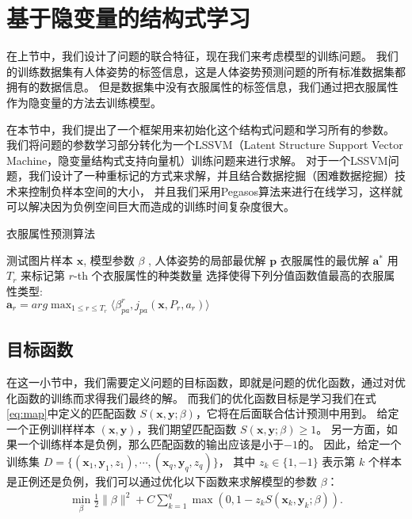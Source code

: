 \section{基于隐变量的结构式学习}
在上节中，我们设计了问题的联合特征，现在我们来考虑模型的训练问题。
我们的训练数据集有人体姿势的标签信息，这是人体姿势预测问题的所有标准数据集都拥有的数据信息。
但是数据集中没有衣服属性的标签信息，我们通过把衣服属性作为隐变量的方法去训练模型。

在本节中，我们提出了一个框架用来初始化这个结构式问题和学习所有的参数。
我们将问题的参数学习部分转化为一个LSSVM（Latent Structure Support Vector Machine，隐变量结构式支持向量机）训练问题来进行求解。
对于一个LSSVM问题，我们设计了一种重标记的方式来求解，并且结合数据挖掘（困难数据挖掘）技术来控制负样本空间的大小，
并且我们采用Pegasos\cite{pegasos}算法来进行在线学习，这样就可以解决因为负例空间巨大而造成的训练时间复杂度很大。

\begin{algorithm}
\caption{衣服属性预测算法}
\begin{algorithmic}[1]
    \REQUIRE 测试图片样本 $\mathbf{x}$, 模型参数 $\beta$ , 人体姿势的局部最优解 $\mathbf{p}$
    \ENSURE 衣服属性的最优解 $\mathbf{a^*}$
    \STATE 用 $T_r$ 来标记第 $r$-th 个衣服属性的种类数量
        \STATE 选择使得下列分值函数值最高的衣服属性类型:\\
            $\mathbf{a}_r = arg \max_{1 \leq r \leq T_r} \langle \beta_{pa}^r, j_{pa}(\mathbf{x}, P_r, a_r) \rangle $
    \ENDFOR
\end{algorithmic}
\label{alg:attr}
\end{algorithm}


\subsection{目标函数}
在这一小节中，我们需要定义问题的目标函数，即就是问题的优化函数，通过对优化函数的训练而求得我们最终的解。
而我们的优化函数目标是学习我们在式\ref{eq:map}中定义的匹配函数 $S(\mathbf{x}, \mathbf{y}; \beta)$，它将在后面联合估计预测中用到。
给定一个正例训样样本 $(\mathbf{x}, \mathbf{y})$，我们期望匹配函数 $S(\mathbf{x}, \mathbf{y}; \beta) \geq 1$。
另一方面，如果一个训练样本是负例，那么匹配函数的输出应该是小于$-1$的。
因此，给定一个训练集 $D = \{ (\mathbf{x}_1, \mathbf{y}_1, z_1), \cdots, (\mathbf{x}_q, \mathbf{y}_q, z_q) \}$， 其中 $z_k \in \{1, -1\}$ 表示第 $k$ 个样本是正例还是负例，我们可以通过优化以下函数来求解模型的参数 $\beta$：
\begin{equation}
\begin{split}
\min_{\beta}  \frac{1}{2} \|\beta\|^2 + C \sum_{k=1}^{q}\max(0, 1 - z_k S(\mathbf{x}_k, \mathbf{y}_k; \beta)).
    \label{eq:latent}
\end{split}
\end{equation}

